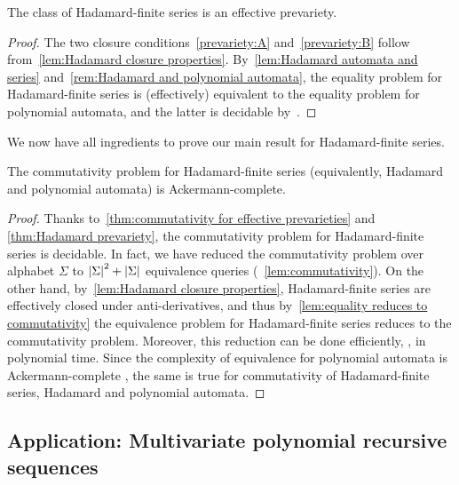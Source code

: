 \begin{theorem}
    \label{thm:Hadamard prevariety}
    The class of Hadamard-finite series is an effective prevariety.
\end{theorem}
\begin{proof}
    The two closure conditions~\cref{prevariety:A} and~\cref{prevariety:B}
    follow from~\cref{lem:Hadamard closure properties}.
    By~\cref{lem:Hadamard automata and series} and~\cref{rem:Hadamard and polynomial automata},
    the equality problem for Hadamard-finite series
    is (effectively) equivalent to the equality problem for polynomial automata,
    and the latter is decidable by~\cite[Corollary 1]{BenediktDuffSharadWorrell:PolyAut:LICS:2017}.
\end{proof}

We now have all ingredients to prove our main result for Hadamard-finite series.
%
\begin{theorem}
    \label{thm:Hadamard-finite series - decidable commutativity}
    The commutativity problem for Hadamard-finite series (equivalently, Hadamard and polynomial automata) is Ackermann-complete.
\end{theorem}
\begin{proof}
    Thanks to~\cref{thm:commutativity for effective prevarieties} and \cref{thm:Hadamard prevariety},
    the commutativity problem for Hadamard-finite series is decidable.
    In fact, we have reduced the commutativity problem over alphabet $\Sigma$
    to $\left|\Sigma\right|^2 + \left|\Sigma\right|$ equivalence queries (\cf~\cref{lem:commutativity}).
    On the other hand, by~\cref{lem:Hadamard closure properties},
    Hadamard-finite series are effectively closed under anti-derivatives,
    and thus by~\cref{lem:equality reduces to commutativity}
    the equivalence problem for Hadamard-finite series
    reduces to the commutativity problem.
    Moreover, this reduction can be done efficiently, \ie, in polynomial time.
    Since the complexity of equivalence for polynomial automata is Ackermann-complete\-
    \cite[Theorem 1 + Corollary 1]{BenediktDuffSharadWorrell:PolyAut:LICS:2017},
    the same is true for commutativity of Hadamard-finite series,
    Hadamard and polynomial automata.
\end{proof}

\subsection{Application: Multivariate polynomial recursive sequences}
\label{sec:multivariate polyrec}

